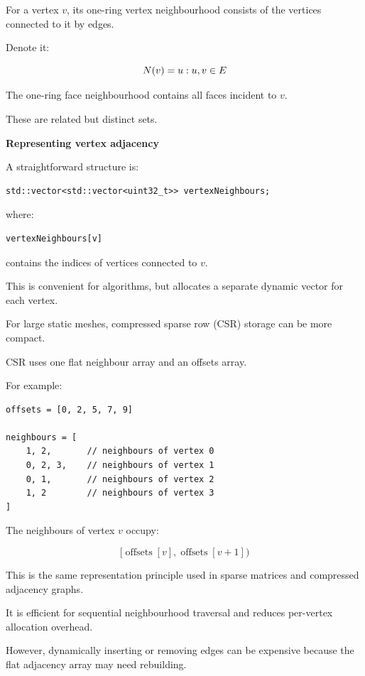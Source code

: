 For a vertex \(v\), its one-ring vertex neighbourhood consists of the vertices connected to it by edges.

Denote it:

\[
N(v)=\\{u:\\{u,v\\}\in E\\}
\]

The one-ring face neighbourhood contains all faces incident to \(v\).

These are related but distinct sets.

\textbf{Representing vertex adjacency}

A straightforward structure is:

\begin{verbatim}
std::vector<std::vector<uint32_t>> vertexNeighbours;
\end{verbatim}

where:

\begin{verbatim}
vertexNeighbours[v]
\end{verbatim}

contains the indices of vertices connected to \(v\).

This is convenient for algorithms, but allocates a separate dynamic vector for each vertex.

For large static meshes, compressed sparse row (CSR) storage can be more compact.

CSR uses one flat neighbour array and an offsets array.

For example:

\begin{verbatim}
offsets = [0, 2, 5, 7, 9]

neighbours = [
    1, 2,       // neighbours of vertex 0
    0, 2, 3,    // neighbours of vertex 1
    0, 1,       // neighbours of vertex 2
    1, 2        // neighbours of vertex 3
]
\end{verbatim}

The neighbours of vertex \(v\) occupy:

\[
[\operatorname{offsets}[v], \operatorname{offsets}[v+1])
\]

This is the same representation principle used in sparse matrices and compressed adjacency graphs.

It is efficient for sequential neighbourhood traversal and reduces per-vertex allocation overhead.

However, dynamically inserting or removing edges can be expensive because the flat adjacency array may need rebuilding.

